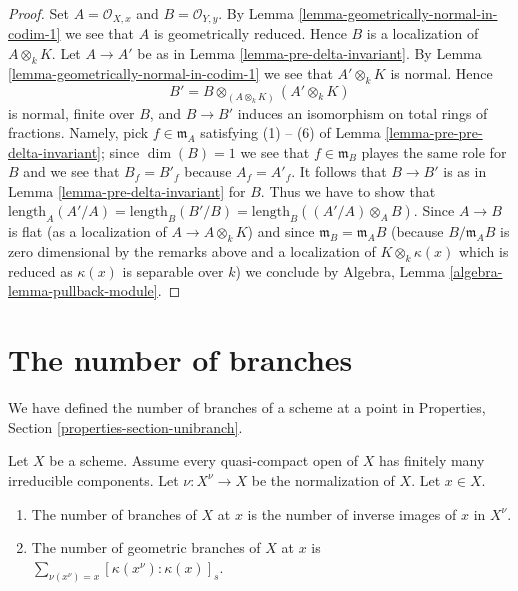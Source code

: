 \begin{proof}
Set $A = \mathcal{O}_{X, x}$ and $B = \mathcal{O}_{Y, y}$.
By Lemma \ref{lemma-geometrically-normal-in-codim-1}
we see that $A$ is geometrically reduced.
Hence $B$ is a localization of $A \otimes_k K$.
Let $A \to A'$ be as in Lemma \ref{lemma-pre-delta-invariant}.
By Lemma \ref{lemma-geometrically-normal-in-codim-1}
we see that $A' \otimes_k K$ is normal.
Hence
$$
B' = B \otimes_{(A \otimes_k K)} (A' \otimes_k K)
$$
is normal, finite over $B$, and $B \to B'$ induces
an isomorphism on total rings of fractions. Namely, pick $f \in \mathfrak m_A$
satisfying (1) -- (6) of Lemma \ref{lemma-pre-pre-delta-invariant};
since $\dim(B) = 1$ we see that $f \in \mathfrak m_B$
playes the same role for $B$ and we see that $B_f = B'_f$ because $A_f = A'_f$.
It follows that $B \to B'$ is as in Lemma \ref{lemma-pre-delta-invariant}
for $B$. Thus we have to show that
$\text{length}_A(A'/A) =
\text{length}_B(B'/B) = \text{length}_B((A'/A) \otimes_A B)$.
Since $A \to B$ is flat (as a localization of $A \to A \otimes_k K$)
and since $\mathfrak m_B = \mathfrak m_A B$ (because
$B/\mathfrak m_A B$ is zero dimensional by the remarks above and
a localization of $K \otimes_k \kappa(x)$ which is reduced as
$\kappa(x)$ is separable over $k$) we conclude by
Algebra, Lemma \ref{algebra-lemma-pullback-module}.
\end{proof}





\section{The number of branches}
\label{section-number-of-branches}

\noindent
We have defined the number of branches of a scheme at a point
in Properties, Section \ref{properties-section-unibranch}.

\begin{lemma}
\label{lemma-number-of-branches}
Let $X$ be a scheme. Assume every quasi-compact open of $X$ has
finitely many irreducible components. Let $\nu : X^\nu \to X$
be the normalization of $X$. Let $x \in X$.
\begin{enumerate}
\item The number of branches of $X$ at $x$ is the number of
inverse images of $x$ in $X^\nu$.
\item The number of geometric branches of $X$ at $x$ is
$\sum_{\nu(x^\nu) = x} [\kappa(x^\nu) : \kappa(x)]_s$.
\end{enumerate}
\end{lemma}

